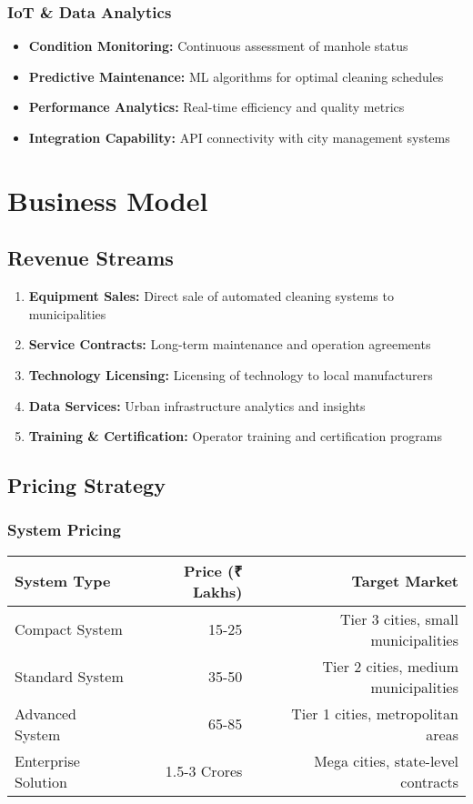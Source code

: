 \documentclass[11pt,a4paper]{article}
\begin{document}
\subsubsection{IoT \& Data Analytics}
\begin{itemize}[leftmargin=2em]
    \item \textbf{Condition Monitoring:} Continuous assessment of manhole status
    \item \textbf{Predictive Maintenance:} ML algorithms for optimal cleaning schedules
    \item \textbf{Performance Analytics:} Real-time efficiency and quality metrics
    \item \textbf{Integration Capability:} API connectivity with city management systems
\end{itemize}

\section{Business Model}

\subsection{Revenue Streams}
\begin{enumerate}[leftmargin=2em]
    \item \textbf{Equipment Sales:} Direct sale of automated cleaning systems to municipalities
    \item \textbf{Service Contracts:} Long-term maintenance and operation agreements
    \item \textbf{Technology Licensing:} Licensing of technology to local manufacturers
    \item \textbf{Data Services:} Urban infrastructure analytics and insights
    \item \textbf{Training \& Certification:} Operator training and certification programs
\end{enumerate}

\subsection{Pricing Strategy}

\subsubsection{System Pricing}
\begin{center}
\begin{tabular}{lrr}
\toprule
\textbf{System Type} & \textbf{Price (₹ Lakhs)} & \textbf{Target Market} \\
\midrule
Compact System & 15-25 & Tier 3 cities, small municipalities \\
Standard System & 35-50 & Tier 2 cities, medium municipalities \\
Advanced System & 65-85 & Tier 1 cities, metropolitan areas \\
Enterprise Solution & 1.5-3 Crores & Mega cities, state-level contracts \\
\bottomrule
\end{tabular}
\end{center}
\end{document}
